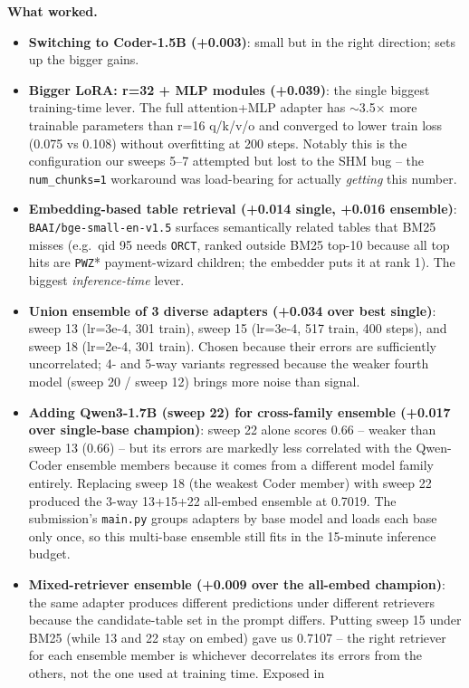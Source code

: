 \documentclass[10pt]{article}
\begin{document}
\textbf{What worked.}
\begin{itemize}
\item \textbf{Switching to Coder-1.5B (+0.003)}: small but in the right direction;
sets up the bigger gains.
\item \textbf{Bigger LoRA: r=32 + MLP modules (+0.039)}: the single biggest
training-time lever. The full attention+MLP adapter has $\sim$3.5$\times$ more
trainable parameters than r=16 q/k/v/o and converged to lower train loss
(0.075 vs 0.108) without overfitting at 200 steps. Notably this is the
configuration our sweeps 5--7 attempted but lost to the SHM bug -- the
\texttt{num\_chunks=1} workaround was load-bearing for actually \emph{getting}
this number.
\item \textbf{Embedding-based table retrieval (+0.014 single, +0.016 ensemble)}:
\texttt{BAAI/bge-small-en-v1.5} surfaces semantically related tables that BM25
misses (e.g.\ qid 95 needs \texttt{ORCT}, ranked outside BM25 top-10 because
all top hits are \texttt{PWZ}* payment-wizard children; the embedder puts it
at rank 1). The biggest \emph{inference-time} lever.
\item \textbf{Union ensemble of 3 diverse adapters (+0.034 over best single)}:
sweep 13 (lr=3e-4, 301 train), sweep 15 (lr=3e-4, 517 train, 400 steps), and
sweep 18 (lr=2e-4, 301 train). Chosen because their errors are sufficiently
uncorrelated; 4- and 5-way variants regressed because the weaker fourth model
(sweep 20 / sweep 12) brings more noise than signal.
\item \textbf{Adding Qwen3-1.7B (sweep 22) for cross-family ensemble (+0.017
over single-base champion)}: sweep 22 alone scores 0.66 -- weaker than
sweep 13 (0.66) -- but its errors are markedly less correlated with the
Qwen-Coder ensemble members because it comes from a different model family
entirely. Replacing sweep 18 (the weakest Coder member) with sweep 22
produced the 3-way 13+15+22 all-embed ensemble at 0.7019. The submission's
\texttt{main.py} groups adapters by base model and loads each base only
once, so this multi-base ensemble still fits in the 15-minute inference
budget.
\item \textbf{Mixed-retriever ensemble (+0.009 over the all-embed champion)}:
the same adapter produces different predictions under different retrievers
because the candidate-table set in the prompt differs. Putting sweep 15
under BM25 (while 13 and 22 stay on embed) gave us 0.7107 -- the right
retriever for each ensemble member is whichever decorrelates its errors
from the others, not the one used at training time. Exposed in

\end{itemize}
\end{document}
